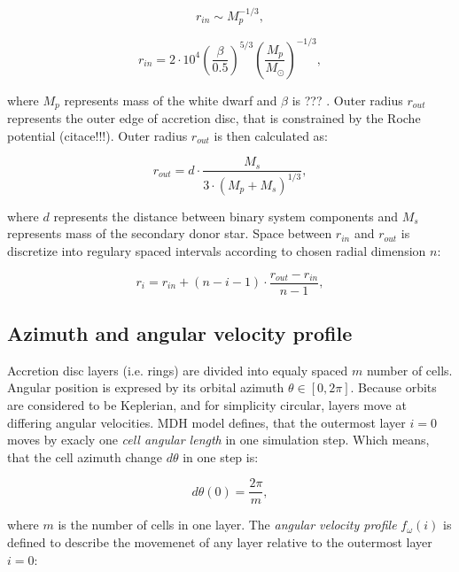 \begin{equation}
    r_{in} \sim M_p^{-1/3},
\end{equation}

\begin{equation}
	r_{in} = 2 \cdot 10^{4} \left(\frac{\beta}{0.5}\right)^{5/3} \left(\frac{M_p}{M_{\odot}}\right)^{-1/3},
\end{equation}

where $M_p$ represents mass of the white dwarf and $\beta$ is ??? . Outer radius $r_{out}$ represents the outer edge of accretion disc, that is constrained by the Roche potential (citace!!!). Outer radius $r_{out}$ is then calculated as:

\begin{equation}
    r_{out} = d \cdot \frac{M_{s}}{3 \cdot (M_p+M_{s})^{1/3}},
\end{equation}

where $d$ represents the distance between binary system components and $M_s$ represents mass of the secondary donor star. Space between $r_{in}$ and $r_{out}$ is discretize into regulary spaced intervals according to chosen radial dimension $n$:

\begin{equation} \label{eq:cell_radius}
    r_i = r_{in} + (n - i - 1) \cdot \frac{r_{out} - r_{in}}{n - 1},
\end{equation}

\subsection{Azimuth and angular velocity profile}
Accretion disc layers (i.e. rings) are divided into equaly spaced $m$ number of cells. Angular position is expresed by its orbital azimuth $\theta \in [0, 2\pi]$. Because orbits are considered to be Keplerian, and for simplicity circular, layers move at differing angular velocities. MDH model defines, that the outermost layer $i = 0$ moves by exacly one \emph{cell angular length} in one simulation step. Which means, that the cell azimuth change $d\theta$ in one step is:

\begin{equation} \label{eq:outer_azm_change}
d\theta(0) = \frac{2\pi}{m},
\end{equation}

where $m$ is the number of cells in one layer. The \emph{angular velocity profile} $f_{\omega}(i)$ is defined to describe the movemenet of any layer relative to the outermost layer $i=0$: 

